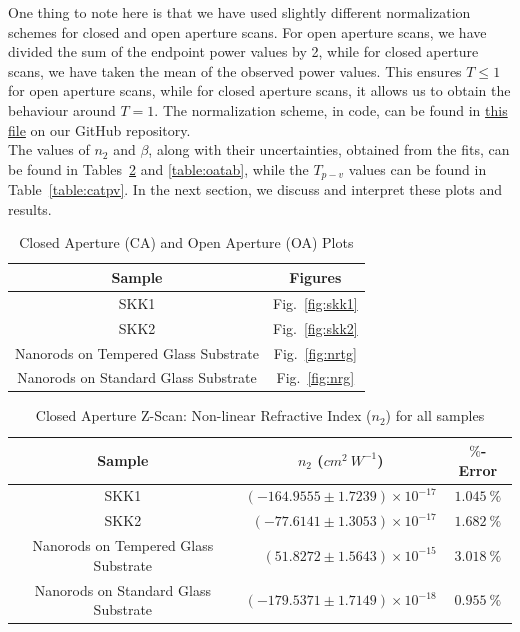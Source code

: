 \documentclass[%
 reprint,
amsmath,
amssymb,
10pt
]{revtex4-2}
\begin{document}
One thing to note here is that we have used slightly different normalization schemes for closed and open aperture scans. For open aperture scans, we have divided the sum of the endpoint power values by 2, while for closed aperture scans, we have taken the mean of the observed power values. This ensures $T \le 1$ for open aperture scans, while for closed aperture scans, it allows us to obtain the behaviour around $T = 1$. The normalization scheme, in code, can be found in \href{https://github.com/JeS24/z_scan/blob/main/notebooks/utils.py}{this file} on our GitHub repository.\\

The values of $n_2$ and $\beta$, along with their uncertainties, obtained from the fits, can be found in Tables~\ref{table:catab} and \ref{table:oatab}, while the $T_{p-v}$ values can be found in Table~\ref{table:catpv}. In the next section, we discuss and interpret these plots and results.

\begin{table}
 \begin{tabular}{c|c}
 \hline\hline
 \textbf{Sample} & \textbf{Figures} \\
 \hline
    SKK1 & Fig.~\ref{fig:skk1} \\
    SKK2 & Fig.~\ref{fig:skk2} \\
    Nanorods on Tempered Glass Substrate & Fig.~\ref{fig:nrtg} \\
    Nanorods on Standard Glass Substrate & Fig.~\ref{fig:nrg} \\
 \hline\hline
\end{tabular}
\captionsetup{width=0.4\textwidth}
\caption{Closed Aperture (CA) and Open Aperture (OA) Plots}
\label{table:conv}
\end{table}

\begin{table}
 \begin{tabular}{c|r|c}
 \hline\hline
 \textbf{Sample} & \multicolumn{1}{c|}{$n_2$ ($cm^2\:W^{-1}$)}  & \textbf{$\%$-Error} \\
 \hline
 SKK1 & $(-164.9555 \pm 1.7239)\times10^{-17}$  &  $1.045\:\%$ \\
 SKK2 & $(-77.6141 \pm 1.3053)\times10^{-17}$  &  $1.682\:\%$ \\
 Nanorods on Tempered Glass Substrate & $(51.8272 \pm 1.5643)\times10^{-15}$ & $3.018\:\%$ \\
 Nanorods on Standard Glass Substrate & $(-179.5371 \pm 1.7149)\times10^{-18}$ & $0.955\:\%$ \\
 \hline\hline
\end{tabular}
\caption{Closed Aperture Z-Scan: Non-linear Refractive Index ($n_2$) for all samples}
\label{table:catab}
\end{table}
\end{document}
